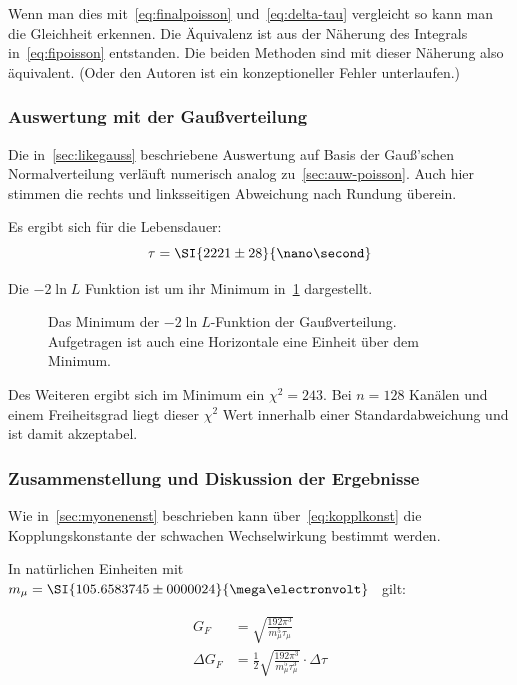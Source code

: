 \documentclass[slug=LM, room=Andreas-Schubert-Bau\,\ K\ 1A, supervisor=Anne-Sophie\ Berthold, coursedate=13.\ 12.\ 2019]{../../Lab_Report_LaTeX/lab_report}
\begin{document}
Wenn man dies mit~\ref{eq:finalpoisson} und~\ref{eq:delta-tau}
vergleicht so kann man die Gleichheit erkennen. Die Äquivalenz ist
aus der N\"aherung des Integrals in~\ref{eq:fipoisson}
entstanden. Die beiden Methoden sind mit dieser N\"aherung also
\"aquivalent. (Oder den Autoren ist ein konzeptioneller
Fehler unterlaufen.)


\subsubsection{Auswertung mit der Gaußverteilung}
\label{sec:auw-gauss}

Die in~\ref{sec:likegauss} beschriebene Auswertung auf Basis der
Gauß'schen Normalverteilung verl\"auft numerisch analog
zu~\ref{sec:auw-poisson}. Auch hier stimmen die rechts und
linksseitigen Abweichung nach Rundung \"uberein.

Es ergibt sich f\"ur die Lebensdauer:
\begin{equation}
  \label{eq:result-poisson}
  \tau = \SI{2221\pm 28}{\nano\second}
\end{equation}

Die \(-2\ln{L}\) Funktion ist um ihr Minimum
in~\ref{fig:haupt-poisson} dargestellt.

\begin{figure}[h]\centering
  
  \caption{Das Minimum der \(-2\ln{L}\)-Funktion der
    Gaußverteilung. Aufgetragen ist auch eine Horizontale eine
    Einheit \"uber dem Minimum.}
  \label{fig:haupt-poisson}
\end{figure}

Des Weiteren ergibt sich im Minimum ein \(\chi^2=243\). Bei \(n=128\)
Kan\"alen und einem Freiheitsgrad liegt dieser \(\chi^2\) Wert
innerhalb einer Standardabweichung und ist damit akzeptabel.


\subsubsection{Zusammenstellung und Diskussion der Ergebnisse}
\label{sec:disk}

Wie in~\ref{sec:myonenenst} beschrieben kann
\"uber~\ref{eq:kopplkonst} die Kopplungskonstante der schwachen
Wechselwirkung bestimmt werden.

In nat\"urlichen Einheiten mit
\(m_\mu = \SI{105.6583745\pm
  0000024}{\mega\electronvolt}\)~\cite{codata} gilt:

\begin{align}
  \label{eq:couplingconstant}
  G_F &= \sqrt{\frac{192\pi^3}{m_\mu^5\tau_\mu}} \\
  \Delta G_F &=
  \frac{1}{2}\sqrt{\frac{192\pi^3}{m_\mu^5\tau_\mu^3}}\cdot \Delta \tau
\end{align}
\end{document}

